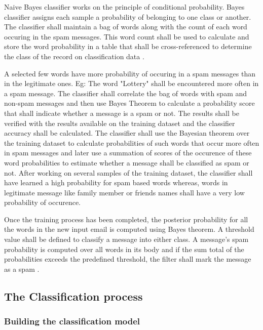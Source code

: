 \documentclass[9pt,twocolumn,twoside]{../../styles/osajnl}
\begin{document}
{Naive Bayes classifier works on the principle of conditional
probability. Bayes classifier assigns each sample a probability of
belonging to one class or another. The classifier shall maintain a bag
of words along with the count of each word occuring in the spam
messages. This word count shall be used to calculate and store the
word probability in a table that shall be cross-referenced to
determine the class of the record on classification data
\cite{paper-classification-of-email}.

\noindent
A selected few words have more probability of occuring in a spam
messages than in the legitimate ones. Eg: The word "Lottery" shall be
encountered more often in a spam message.  The classifier shall
correlate the bag of words with spam and non-spam messages and then
use Bayes Theorem to calculate a probability score that shall indicate
whether a message is a spam or not. The results shall be verified with
the results available on the training dataset and the classifier
accuracy shall be calculated. The classifier shall use the Bayesian
theorem over the training dataset to calculate probabilities of such
words that occur more often in spam messages and later use a summation
of scores of the occurence of these word probabilities to estimate
whether a message shall be classified as spam or not. After working on
several samples of the training dataset, the classifier shall have
learned a high probability for spam based words whereas, words in
legitimate message like family member or friends names shall have a
very low probability of occurence.

\noindent
Once the training process has been completed, the posterior
probability for all the words in the new input email is computed using
Bayes theorem. A threshold value shall be defined to classify a
message into either class. A message's spam probability is computed
over all words in its body and if the sum total of the probabilities
exceeds the predefined threshold, the filter shall mark the message as
a spam \cite{www-wiki-naivebayes}.

\subsection{The Classification process}

\subsubsection{Building the classification model}

}
\end{document}
